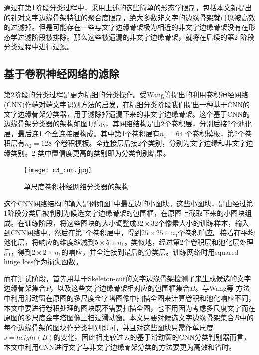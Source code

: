         通过在第1阶段分类过程中，采用上述的这些简单的形态学限制，包括本文新提出的针对文字边缘骨架特征的聚合度限制，绝大多数非文字的边缘骨架就可以被高效的过滤掉。但是可能存在一些与文字边缘骨架极为相近的非文字边缘骨架没有在形态学过滤阶段被排除。那么这些被遗漏的非文字边缘骨架，就将在后续的第2 阶段分类过程中进行过滤。

        \subsection{基于卷积神经网络的滤除}

        第2阶段的分类过程是更为精细的分类操作。受Wang等\cite{Wang2012End}提出的利用卷积神经网络(CNN)作端对端文字识别方法的启发，在精细分类阶段我们提出一种基于CNN的文字边缘骨架分类器，用于滤除掉遗漏下来的非文字边缘骨架。这个基于CNN的边缘骨架分类器的架构如图\ref{fig.c3_cnn}所示，其网络结构是由2个卷积层，分别后接2个池化层，最后连1 个全连接层构成。其中第1个卷积层有$n_1 = 64$ 个卷积模板，第2个卷积层有$n_2 = 128$ 个卷积模板。全连接层后接2个类别，分别为文字边缘和非文字边缘类别。2 类中置信度更高的类别即为分类判别结果。

        \begin{figure}[htbp]
        \centering
        \texttt{[image: c3\_cnn.jpg]}
        \caption{单尺度卷积神经网络分类器的架构} \label{fig.c3_cnn}
        \end{figure}

        这个CNN网络结构的输入是例如图\ref{fig.c3_cnn}中最左边的小图块。这些小图块，是由经过第1阶段分类后被判别为候选文字边缘骨架的包围框，在原图上截取下来的小图块组成。在训练阶段，将这些图块的大小调整成$32 \times 32$个像素大小的训练样本，输入到CNN网络中。然后在第1个卷积层中，得到$25 \times 25 \times n_1$个卷积响应。接着在平均池化层，将响应的维度缩减到$5 \times 5 \times n_1$。类似地，经过第2个卷积层和池化层处理后，得到$2 \times 2\times n_1$的响应，并全连接到最后的分类层。训练网络时用squared hinge loss作为损失函数。

        而在测试阶段，首先用基于Skeleton-cut的文字边缘骨架检测子来生成候选的文字边缘骨架集合$P$，以及这些文字边缘骨架相对应的包围框集合$B$。与Wang等\cite{Wang2012End} 方法中利用滑动窗在原图的多尺度金字塔图像中扫描全图来计算卷积和池化响应不同，本文中要进行卷积处理的图块既不需要扫描全图，也不用因为考虑多尺度文字而在原图的多尺度金字塔图像上扫过滑动窗。本文只要对候选文字边缘骨架集合$B$中的每个边缘骨架的图块作分类判别即可，并且对这些图块只需作单尺度$s = height(B)$的变化。因此相比较过去的基于滑动窗的CNN分类判别器而言，本文中利用CNN进行文字与非文字边缘骨架分类的方法要更为高效和省时。

